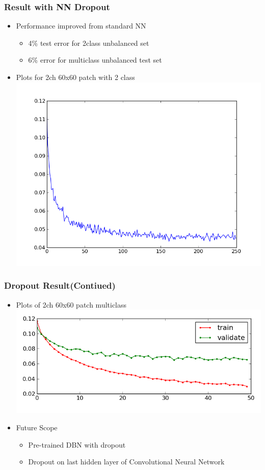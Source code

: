 \documentclass[14pt,mathserif]{beamer}
\begin{document}
\frame
{
  \frametitle{Result with NN Dropout}
  \begin{itemize}
     \setlength{\itemsep}{1em}
     \item Performance improved from standard NN
      \begin{itemize}
      	\item 4\% test error for 2class unbalanced set
        	\item 6\% error for multiclass unbalanced test set
        	\end{itemize}
   \end{itemize}
   \begin{itemize}
     \setlength{\itemsep}{1em}
     \item Plots for 2ch 60x60 patch with 2 class   	
  	\includegraphics[scale=0.35]{NN_dropout_2class_validation_error.png} 
  	\end{itemize}
}

\frame
{
  \frametitle{Dropout Result(Contiued)}
  \begin{itemize}
     \setlength{\itemsep}{1em}
     \item Plots of 2ch 60x60 patch multiclass
     \includegraphics[scale=0.50]{3class_errors.png}  
   \end{itemize}
   \begin{itemize}
     \setlength{\itemsep}{1em}
     \item Future Scope
     \begin{itemize}
     	\item Pre-trained DBN with dropout
     	\item Dropout on last hidden layer of Convolutional Neural Network
     \end{itemize}
  	\end{itemize}
}
\end{document}

